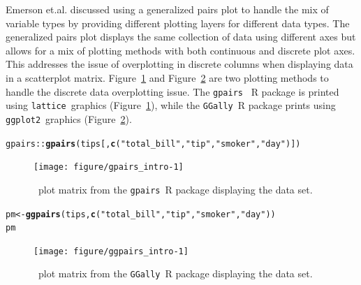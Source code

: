 \documentclass[stat,dissertation]{puthesis}\usepackage[]{graphicx}\usepackage{xcolor}
\makeatletter
\newcommand{\hlstr}[1]{\textcolor[rgb]{0.192,0.494,0.8}{#1}}%
\newcommand{\hlopt}[1]{\textcolor[rgb]{0,0,0}{#1}}%
\newcommand{\hlstd}[1]{\textcolor[rgb]{0.345,0.345,0.345}{#1}}%
\newcommand{\hlkwb}[1]{\textcolor[rgb]{0.69,0.353,0.396}{#1}}%
\newcommand{\hlkwd}[1]{\textcolor[rgb]{0.737,0.353,0.396}{\textbf{#1}}}%
\newenvironment{kframe}{%
 \def\at@end@of@kframe{}%
 \ifinner\ifhmode%
  \def\at@end@of@kframe{\end{minipage}}%
  \begin{minipage}{\columnwidth}%
 \fi\fi%
 \def\FrameCommand##1{\hskip\@totalleftmargin \hskip-\fboxsep
 \colorbox{shadecolor}{##1}\hskip-\fboxsep
     \hskip-\linewidth \hskip-\@totalleftmargin \hskip\columnwidth}%
 \MakeFramed {\advance\hsize-\width
   \@totalleftmargin\z@ \linewidth\hsize
   \@setminipage}}%
 {\par\unskip\endMakeFramed%
 \at@end@of@kframe}
\newenvironment{knitrout}{}{} %
\renewenvironment{knitrout}{\setstretch{1}}{}
\newcommand{\pkg}[1]{\texttt{#1}}
\newcommand{\ggplot}{\pkg{ggplot2}}
\newcommand{\GGally}{\pkg{GGally}}
\makeatother
\begin{document}
  Emerson et.al. discussed using a generalized pairs plot to handle the mix of variable types by providing different plotting layers for different data types.  The generalized pairs plot displays the same collection of data using different axes but allows for a mix of plotting methods with both continuous and discrete plot axes.  This addresses the issue of overplotting in discrete columns when displaying data in a scatterplot matrix.  Figure~\ref{fig:gpairs_intro} and Figure~\ref{fig:ggpairs_intro} are two plotting methods to handle the discrete data overplotting issue.  The \pkg{gpairs}~\cite{r_gpairs} R package is printed using \pkg{lattice}~graphics (Figure~\ref{fig:gpairs_intro}), while the \GGally~R package prints using \ggplot~graphics (Figure~\ref{fig:ggpairs_intro}).

\begin{knitrout}\small
{}\color{fgcolor}\begin{kframe}
\begin{alltt}
\hlstd{gpairs}\hlopt{::}\hlkwd{gpairs}\hlstd{(tips[,} \hlkwd{c}\hlstd{(}\hlstr{"total_bill"}\hlstd{,} \hlstr{"tip"}\hlstd{,} \hlstr{"smoker"}\hlstd{,} \hlstr{"day"}\hlstd{)])}
\end{alltt}
\end{kframe}\begin{figure}[H]

{\centering \texttt{[image: figure/gpairs\_intro-1]} 

}

\caption{~plot matrix from the \pkg{gpairs}~R package displaying the  data set.}\label{fig:gpairs_intro}
\end{figure}


\end{knitrout}

\newpage
\begin{knitrout}\small
{}\color{fgcolor}\begin{kframe}
\begin{alltt}
\hlstd{pm} \hlkwb{<-} \hlkwd{ggpairs}\hlstd{(tips,} \hlkwd{c}\hlstd{(}\hlstr{"total_bill"}\hlstd{,} \hlstr{"tip"}\hlstd{,} \hlstr{"smoker"}\hlstd{,} \hlstr{"day"}\hlstd{))}
\hlstd{pm}
\end{alltt}
\end{kframe}\begin{figure}[H]

{\centering \texttt{[image: figure/ggpairs\_intro-1]} 

}

\caption{~plot matrix from the \GGally~R package displaying the  data set.}\label{fig:ggpairs_intro}
\end{figure}


\end{knitrout}
\end{document}
